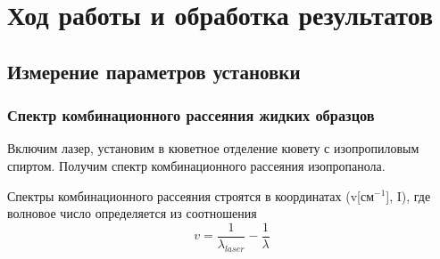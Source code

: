 \documentclass[a4paper,12pt]{article} %
\begin{document}
\newpage
\section{Ход работы и обработка результатов}
\begin{itemize}
\subsection{Измерение параметров установки}
\subsubsection{Спектр комбинационного рассеяния жидких образцов}
Включим лазер,
установим в кюветное отделение кювету с изопропиловым спиртом. Получим спектр комбинационного рассеяния изопропанола.


Спектры комбинационного рассеяния строятся в координатах (v[см$^{-1}$], I), где волновое число определяется из соотношения
\begin{equation*}
    v = \frac{1}{\lambda_{laser}} - \frac{1}{\lambda}
\end{equation*}



\end{itemize}
\end{document}
